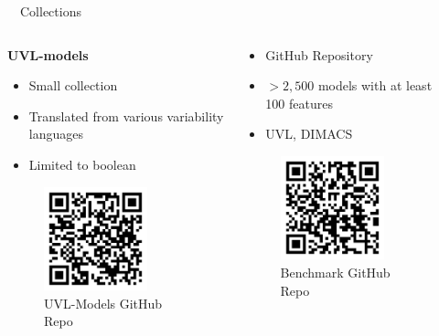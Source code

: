 \documentclass[
	aspectratio=169, %
	8pt, %
	nosectionframes, %
]{beamer}
\newcommand{\inlinesubtitle}[1]{\textcolor{gray!60}{~{}~#1}}
\begin{document}
\begin{frame}{\insertsection \inlinesubtitle{Collections}}
    \vspace{0.4cm}
    \begin{columns}[t]
		\begin{column}{0.3\textwidth}
			\textbf{UVL-models}
            \begin{itemize}
                \item Small collection
                \item Translated from various variability languages
                \item Limited to boolean
            \end{itemize}
            \begin{figure}
                \centering
                \includegraphics[width=3cm]{pics/qr/collection.pdf}
                \caption{UVL-Models GitHub Repo}
            \end{figure}
		\end{column}%
		\begin{column}{0.3\textwidth}
            \begin{itemize}
                \item GitHub Repository
                \item $>2,500$ models with at least 100 features
                \item UVL, DIMACS
            \end{itemize}
            \begin{figure}
                \centering
                \includegraphics[width=3cm]{pics/qr/benchmark.pdf}
                \caption{Benchmark GitHub Repo}
            \end{figure}
		\end{column}
        \begin{column}{0.3\textwidth}

\end{column}
\end{columns}
\end{frame}
\end{document}
